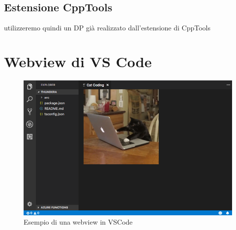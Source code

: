 \subsection{Estensione CppTools}
utilizzeremo quindi un DP già realizzato dall'estensione di CppTools
\section{Webview di VS Code}

\begin{figure}[h]
    \centering
    \includegraphics[width=0.7\columnwidth]{images/cat_coding.png}
    \caption{Esempio di una webview in VSCode}
    \label{fig:webcat}
\end{figure}
